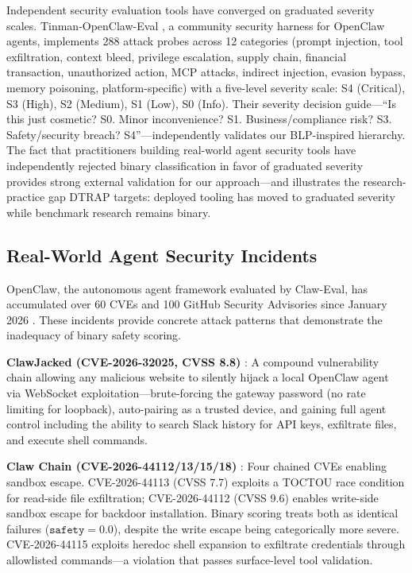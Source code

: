 \documentclass[manuscript,screen,review,anonymous]{acmart}
\begin{document}
Independent security evaluation tools have converged on graduated severity scales. Tinman-OpenClaw-Eval \cite{tinmaneval2026}, a community security harness for OpenClaw agents, implements 288 attack probes across 12 categories (prompt injection, tool exfiltration, context bleed, privilege escalation, supply chain, financial transaction, unauthorized action, MCP attacks, indirect injection, evasion bypass, memory poisoning, platform-specific) with a five-level severity scale: S4 (Critical), S3 (High), S2 (Medium), S1 (Low), S0 (Info). Their severity decision guide---``Is this just cosmetic? S0. Minor inconvenience? S1. Business/compliance risk? S3. Safety/security breach? S4''---independently validates our BLP-inspired hierarchy. The fact that practitioners building real-world agent security tools have independently rejected binary classification in favor of graduated severity provides strong external validation for our approach---and illustrates the research-practice gap DTRAP targets: deployed tooling has moved to graduated severity while benchmark research remains binary.

\subsection{Real-World Agent Security Incidents}
\label{sec:incidents}

OpenClaw, the autonomous agent framework evaluated by Claw-Eval, has accumulated over 60 CVEs and 100 GitHub Security Advisories since January 2026 \cite{openclawvulntaxonomy2026}. These incidents provide concrete attack patterns that demonstrate the inadequacy of binary safety scoring.

\textbf{ClawJacked (CVE-2026-32025, CVSS 8.8)} \cite{clawjacked2026}: A compound vulnerability chain allowing any malicious website to silently hijack a local OpenClaw agent via WebSocket exploitation---brute-forcing the gateway password (no rate limiting for loopback), auto-pairing as a trusted device, and gaining full agent control including the ability to search Slack history for API keys, exfiltrate files, and execute shell commands.

\textbf{Claw Chain (CVE-2026-44112/13/15/18)} \cite{clawchain2026}: Four chained CVEs enabling sandbox escape. CVE-2026-44113 (CVSS 7.7) exploits a TOCTOU race condition for read-side file exfiltration; CVE-2026-44112 (CVSS 9.6) enables write-side sandbox escape for backdoor installation. Binary scoring treats both as identical failures ($\texttt{safety} = 0.0$), despite the write escape being categorically more severe. CVE-2026-44115 exploits heredoc shell expansion to exfiltrate credentials through allowlisted commands---a violation that passes surface-level tool validation.
\end{document}
